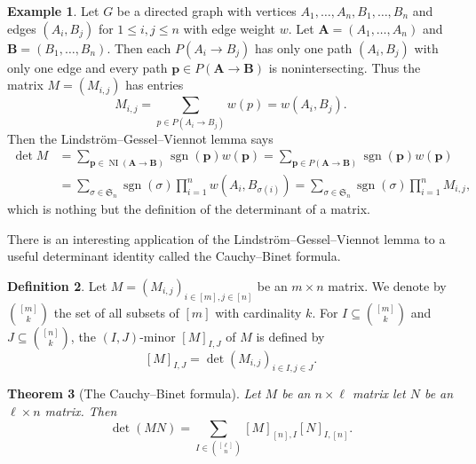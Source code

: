 \documentclass[oneside]{book}
\numberwithin{equation}{section}
\newtheorem{thm}{Theorem}[section]
\theoremstyle{definition}
\newtheorem{exam}[thm]{Example}
\newtheorem{defn}[thm]{Definition}
\newcommand\NI{\operatorname{NI}}
\newcommand\sgn{\operatorname{sgn}}
\newcommand\sym{\mathfrak{S}}
\renewcommand\vec[1]{\mathbf{#1}}
\begin{document}
\begin{exam}
  Let \( G \) be a directed graph with vertices
  \( A_1,\dots,A_n, B_1,\dots,B_n \) and edges \( (A_i,B_j) \) for
  \( 1\le i,j\le n \) with edge weight \( w \). Let
  \( \vec A = (A_1,\dots,A_n) \) and \( \vec B = (B_1,\dots,B_n) \).
  Then each \( P(A_i\to B_j) \) has only one path \( (A_i,B_j) \) with
  only one edge and every path \( \vec p \in P(\vec A \to \vec B) \)
  is nonintersecting. Thus the matrix \( M=(M_{i,j}) \) has entries
  \[
    M_{i,j} = \sum_{p\in P(A_i\to B_j)} w(p) = w(A_i,B_j).
  \]
  Then the Lindstr\"om--Gessel--Viennot lemma says
  \begin{align*}
    \det M
    &= \sum_{\vec p \in \NI(\vec A \to \vec B)} \sgn(\vec p) w(\vec p)
    = \sum_{\vec p \in P(\vec A \to \vec B)} \sgn(\vec p) w(\vec p)\\
    &= \sum_{\sigma\in\sym_n} \sgn(\sigma) \prod_{i=1}^{n} w(A_i,B_{\sigma(i)})
    = \sum_{\sigma\in\sym_n} \sgn(\sigma) \prod_{i=1}^{n} M_{i,j},
  \end{align*}
  which is nothing but the definition of the determinant of a matrix.
\end{exam}

There is an interesting application of the
Lindstr\"om--Gessel--Viennot lemma to a useful determinant identity
called the Cauchy--Binet formula.

\begin{defn}\label{def:6}
  Let \( M = (M_{i,j})_{i\in [m], j\in [n]} \) be an \( m\times n \)
  matrix. We denote by \( \binom{[m]}{k} \) the set of all subsets of
  \( [m] \) with cardinality \( k \). For
  \( I\subseteq \binom{[m]}{k} \) and \( J\subseteq \binom{[n]}{k} \),
  the \( (I,J) \)-minor \( [M]_{I,J} \) of \( M \) 
  is defined by
  \[
    [M]_{I,J} = \det (M_{i,j})_{i\in I,j\in J}.
  \]
\end{defn}

\begin{thm}[The Cauchy--Binet formula]\label{thm:7}
  Let \( M \) be an \( n\times \ell \) matrix let \( N \) be an
  \( \ell\times n \) matrix.
  Then
  \[
    \det (MN) = \sum_{I\in \binom{[\ell]}{n}} [M]_{[n],I} [N]_{I,[n]}.
  \]
\end{thm}
\end{document}
